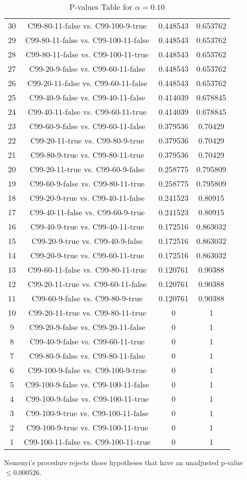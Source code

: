 \documentclass[a4paper,10pt]{article}
\begin{document}
\begin{landscape}
\begin{table}[!htp]
\begin{tabular}{cccc}
30&C99-80-11-false vs. C99-100-9-true&0.448543&0.653762\\
29&C99-80-11-false vs. C99-100-11-false&0.448543&0.653762\\
28&C99-80-11-false vs. C99-100-11-true&0.448543&0.653762\\
27&C99-20-9-false vs. C99-60-11-false&0.448543&0.653762\\
26&C99-20-11-false vs. C99-60-11-false&0.448543&0.653762\\
25&C99-40-9-false vs. C99-40-11-false&0.414039&0.678845\\
24&C99-40-11-false vs. C99-60-11-true&0.414039&0.678845\\
23&C99-60-9-false vs. C99-60-11-false&0.379536&0.70429\\
22&C99-20-11-true vs. C99-80-9-true&0.379536&0.70429\\
21&C99-80-9-true vs. C99-80-11-true&0.379536&0.70429\\
20&C99-20-11-true vs. C99-60-9-false&0.258775&0.795809\\
19&C99-60-9-false vs. C99-80-11-true&0.258775&0.795809\\
18&C99-20-9-true vs. C99-40-11-false&0.241523&0.80915\\
17&C99-40-11-false vs. C99-60-9-true&0.241523&0.80915\\
16&C99-40-9-true vs. C99-40-11-true&0.172516&0.863032\\
15&C99-20-9-true vs. C99-40-9-false&0.172516&0.863032\\
14&C99-20-9-true vs. C99-60-11-true&0.172516&0.863032\\
13&C99-60-11-false vs. C99-80-11-true&0.120761&0.90388\\
12&C99-20-11-true vs. C99-60-11-false&0.120761&0.90388\\
11&C99-60-9-false vs. C99-80-9-true&0.120761&0.90388\\
10&C99-20-11-true vs. C99-80-11-true&0&1\\
9&C99-20-9-false vs. C99-20-11-false&0&1\\
8&C99-40-9-false vs. C99-60-11-true&0&1\\
7&C99-80-9-false vs. C99-80-11-false&0&1\\
6&C99-100-9-false vs. C99-100-9-true&0&1\\
5&C99-100-9-false vs. C99-100-11-false&0&1\\
4&C99-100-9-false vs. C99-100-11-true&0&1\\
3&C99-100-9-true vs. C99-100-11-false&0&1\\
2&C99-100-9-true vs. C99-100-11-true&0&1\\
1&C99-100-11-false vs. C99-100-11-true&0&1\\
\hline
\end{tabular}
\caption{P-values Table for $\alpha=0.10$}
\end{table}Nemenyi's procedure rejects those hypotheses that have an unadjusted p-value $\le0.000526$.


\end{landscape}
\end{document}

